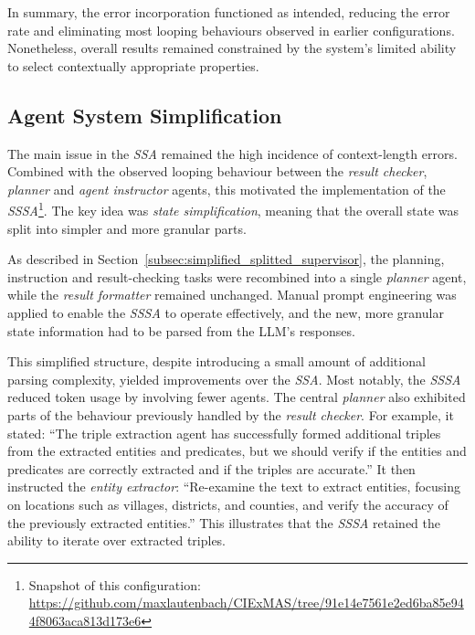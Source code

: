 \documentclass[a4paper,oneside,bibliography=totoc]{scrbook}
\begin{document}
In summary, the error incorporation functioned as intended, reducing the error rate and eliminating most looping behaviours observed in earlier configurations. Nonetheless, overall results remained constrained by the system's limited ability to select contextually appropriate properties.

\subsection{Agent System Simplification}
\label{subsec:task_simplification_state_refinement}

The main issue in the \textit{\ac{SSA}} remained the high incidence of context-length errors. Combined with the observed looping behaviour between the \textit{result checker}, \textit{planner} and \textit{agent instructor} agents, this motivated the implementation of the \textit{\ac{SSSA}}\footnote{Snapshot of this configuration: \url{https://github.com/maxlautenbach/CIExMAS/tree/91e14e7561e2ed6ba85e944f8063aca813d173e6}}. The key idea was \textit{state simplification}, meaning that the overall state was split into simpler and more granular parts.

As described in Section~\ref{subsec:simplified_splitted_supervisor}, the planning, instruction and result-checking tasks were recombined into a single \textit{planner} agent, while the \textit{result formatter} remained unchanged. Manual prompt engineering was applied to enable the \textit{\ac{SSSA}} to operate effectively, and the new, more granular state information had to be parsed from the \ac{LLM}'s responses.

This simplified structure, despite introducing a small amount of additional parsing complexity, yielded improvements over the \textit{\ac{SSA}}. Most notably, the \textit{\ac{SSSA}} reduced token usage by involving fewer agents. The central \textit{planner} also exhibited parts of the behaviour previously handled by the \textit{result checker}. For example, it stated: \enquote{The triple extraction agent has successfully formed additional triples from the extracted entities and predicates, but we should verify if the entities and predicates are correctly extracted and if the triples are accurate.} It then instructed the \textit{entity extractor}: \enquote{Re-examine the text to extract entities, focusing on locations such as villages, districts, and counties, and verify the accuracy of the previously extracted entities.} This illustrates that the \textit{\ac{SSSA}} retained the ability to iterate over extracted triples.
\end{document}
